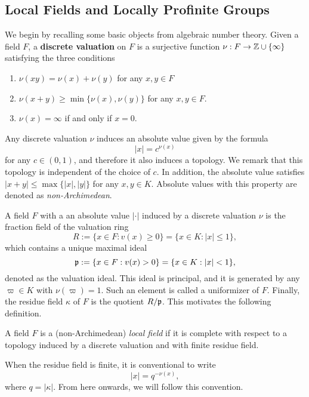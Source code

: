 \subsection{Local Fields and Locally Profinite Groups}
We begin by recalling some basic objects from algebraic number theory. Given a field $F$, a \textbf{discrete valuation} on $F$ is a surjective function $\nu: F\to\mathbb{Z}\cup\{\infty\}$ satisfying the three conditions

\begin{enumerate}
    \item $\nu(xy)=\nu(x)+\nu(y)$ for any $x,y\in F$ 
    \item $\nu(x+y)\geq\min\{\nu(x),\nu(y)\}$ for any $x,y\in F$.
    \item $\nu(x)=\infty$ if and only if $x=0$.
\end{enumerate}

Any discrete valuation $\nu$ induces an absolute value given by the formula 
$$|x|=c^{\nu(x)}$$ 
for any $c\in(0,1)$, and therefore it also induces a topology. We remark that this topology is independent of the choice of $c$. In addition, the absolute value satisfies $|x+y|\leq\max\{|x|,|y|\}$ for any $x,y\in K$. Absolute values with this property are denoted as \textit{non-Archimedean}.

A field $F$ with a an absolute value $|\cdot|$ induced by a discrete valuation $\nu$ is the fraction field of the valuation ring
$$R:=\{x\in F:v(x)\geq 0\}=\{x\in K: |x|\leq1\},$$ 
which contains a unique maximal ideal
$$\mathfrak{p}:=\{x\in F:v(x)> 0\}=\{x\in K: |x|<1\},$$
denoted as the valuation ideal. This ideal is principal, and it is generated by any $\varpi\in K$ with $\nu(\varpi)=1$. Such an element is called a uniformizer of $F$. Finally, the residue field $\kappa$ of $F$ is the quotient $R/\mathfrak{p}$. This motivates the following definition.

\begin{defn}
    A field $F$ is a (non-Archimedean) \textit{local field} if it is complete with respect to a topology induced by a discrete valuation and with finite residue field.
\end{defn}

\begin{rem}
    When the residue field is finite, it is conventional to write 
    $$|x|=q^{-\nu(x)},$$ 
    where $q=|\kappa|$. From here onwards, we will follow this convention.
\end{rem}

